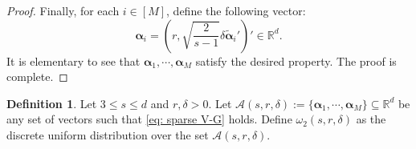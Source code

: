 \documentclass[aos,preprint]{imsart}
\theoremstyle{plain}
\theoremstyle{definition}
\newtheorem{definition}{Definition}
\newcommand{\balpha}{\boldsymbol{\alpha}}
\newcommand{\mR}{\mathbb{R}}
\newcommand{\bR}{\mathbb{R}}
\begin{document}
\begin{appendix}
\begin{proof}
Finally, for each $i\in[M]$, define the following vector:
$$\balpha_i = (r,\sqrt{\frac{2}{s-1}}\delta\tilde{\balpha}_i')' \in \mR^d.$$
It is elementary to see that $\balpha_1,\cdots, \balpha_M$ satisfy the desired property. The proof is complete.
\end{proof}




\begin{definition}\label{def: omega_2}
Let $3 \leq s \leq d$ and $r,\delta > 0$.  Let $\mathcal{A}(s,r,\delta):=\{\balpha_1,\cdots, \balpha_M\} \subseteq \bR^{d}$ be any set of vectors such that \eqref{eq: sparse V-G} holds. Define $\omega_2(s,r,\delta)$ as the discrete uniform distribution over the set $\mathcal{A}(s,r,\delta)$.
\end{definition}


\end{appendix}
\end{document}

